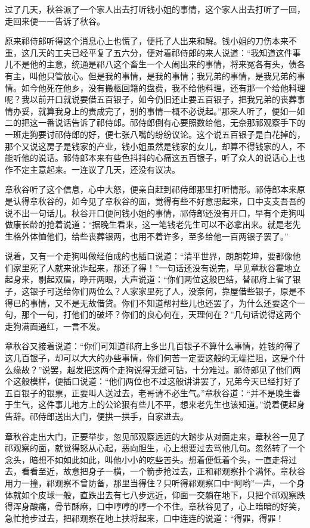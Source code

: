 \documentclass[12pt,UTF8]{ctexbook}
\begin{document}
{{{过了几天，秋谷派了一个家人出去打听钱小姐的事情，这个家人出去打听了一回，走回来便一一告诉了秋谷。

原来祁侍郎听得这个消息心上也慌了，便托了人出来和解。钱小姐的刀伤本来不重，这几天的工夫已经平复了五六分，便对着祁侍郎的来人说道：“我知道这件事儿不是他的主意，统通是祁八这个畜生一个人闹出来的事情，将来冤各有头，债各有主，叫他只管放心。但是我的事情，是我的事情；我兄弟的事情，是我兄弟的事情。如今他死在他乡，没有搬柩回籍的盘费，我不给他料理，还有那一个给他料理呢？我以前开口就说要借五百银子，如今仍旧还止要五百银子，把我兄弟的丧葬事情办妥，就算我身上的责成完了，别的事情一概不必说起。”那来人听了，便如一如二的把这一番说话告诉了祁侍郎。祁侍郎倒有心要照数给他，无奈那祁观察手下的一班走狗要讨祁侍郎的好，便七张八嘴的纷纷议论。这个说五百银子是白花掉的，那个又说这房子是钱家的产业，钱小姐虽然是钱家的女儿，却算不得钱家的人，不能听他的说话。祁侍郎本来有些色抖抖的心痛这五百银子，听了众人的说话心上也作不定主意起来。一连议了几天，还没有议决。

章秋谷听了这个信息，心中大怒，便亲自赶到祁侍郎那里打听情形。祁侍郎本来原是认得章秋谷的，如今见了章秋谷的面，觉得有些不好意思起来，口中支支吾吾的说不出一句话儿。秋谷开口便问钱小姐的事情，祁侍郎还没有开口，早有个走狗叫做康长龄的抢着说道：“据晚生看来，这一笔钱老先生可以不必拿出来。就是老先生格外体恤他们，给些丧葬银两，也用不着许多，至多给他一百两银子罢了。”

说着，又有一个走狗叫做经伯成的也插口说道：“清平世界，朗朗乾坤，要都像他们家里死了人就来讹诈起来，那还了得！”一句话还没有说完，早见章秋谷霍地立起身来，剔起双眉，睁开两眼，大声说道：“你们两位这般巴结，替祁府上省了银子，这银子可送给你们两位么？人家家里死了人，没奈何，靠屋借些银子，原是不得已的事情，又不是无故借贷。你们不知道帮衬些儿也还罢了，为什么还要这个一句，那个一句，打他们的破坏？你们的良心何在，天理何在？”几句话说得这两个走狗满面通红，一言不发。

章秋谷又接着说道：“你们可知道祁府上多出几百银子不算什么事情，姓钱的得了这几百银子，却可以大大的办些事情，你们何苦一定要这般的无端拦阻，这是个什么缘故？”说罢，越发把这两个走狗说得无缝可钻，十分难过。祁侍郎见了他们两个这般模样，便插口说道：“他们两位也不过这般讲讲罢了，兄弟今天已经打好了五百银子的银票，正要叫人送过去，老哥请不必生气。”章秋谷道：“并不是晚生善于生气，这件事儿地方上的公论狠有些儿不平，想来老先生也该知道。”说着便起身告辞。祁侍郎送出大门，便拱一拱手，自家进去。

章秋谷走出大门，正要举步，忽见祁观察远远的大踏步从对面走来，章秋谷一见了祁观察的面，就觉得怒从心起，恶向胆生，心上想要过去骂他几句。忽然转了一个念头，暗想不如如此如此，叫他小小的吃些苦头。想着便低着个头，一直走将过去，看看至近，故意把身子一横，一个箭步抢过去，正和祁观察扑个满怀。章秋谷用力一撞，祁观察不曾防备，那里当得住？只听得祁观察口中“阿哟”一声，一个身体就如个皮球一般，直跌出去有七八步远近，仰面一交躺在地下，只把个祁观察跌得浑身酸痛，骨节酥麻，口中哼哼的哼一个不住。章秋谷见了，心上暗暗的好笑，急忙抢步过去，把祁观察在地上扶将起来，口中连连的说道：“得罪，得罪！

}}}
\end{document}
